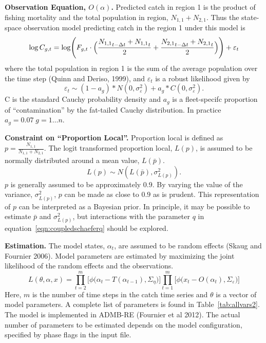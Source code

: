 \documentclass[12pt,letterpaper,twoside]{article}
\newcommand\None{{N_{1,1}}}
\newcommand\Ntwo{{N_{2,1}}}
\newcommand\Nsum{{N_{1,1}+N_{2,1}}}
\begin{document}
{\bf Observation Equation, $O(\alpha)$.}
Predicted catch in region 1 is the product of fishing mortality
and the total population in region, $\None+\Ntwo$.
Thus the state-space observation model predicting catch in the region 1
under this model is
\begin{equation}
\log C_{g,t} = \log \Biggl(F_{g,t}\cdot\Bigl(\frac{\None_{t-\Delta t}+\None_t}{2}
                           +\frac{\Ntwo_{t-\Delta
t}+\Ntwo_t}{2}\Bigr)\Biggr) + \varepsilon_t
\label{eqn:obs2}
\end{equation}
where the total population in region 1 is the sum of the average
population over the time step (Quinn and Deriso, 1999), and
$\varepsilon_t$ is a robust likelihood given by
\begin{equation}
\varepsilon_t \sim (1-a_g)*N(0,\sigma^2_\varepsilon)+a_g*C(0,\sigma^2_\varepsilon).
\end{equation}
C is the standard Cauchy probability density and $a_g$ is a
fleet-specifc proportion of ``contamination'' by the fat-tailed Cauchy
distribution. In practice $a_g = 0.07\; g=1\ldots n$.

{\bf Constraint on ``Proportion Local''.}
Proportion local is defined as $p = \frac{\None}{\Nsum}$. The logit
transformed proportion local, $L(p)$, is assumed to be normally
distributed around a mean value, $L(\bar{p})$.
\begin{equation}
\label{eqn:LpropL}
L(p)\sim N(L(\bar{p}),\sigma^2_{L(p)}).
\end{equation} 
$p$ is generally assumed to be approximately $0.9$. By varying the
value of the variance, $\sigma^2_{L(p)}$, $p$ can be made as
close to $0.9$ as is prudent.
This representation of $p$ can be interpreted as a Bayesian prior.
In principle, it may be possible to
estimate $\bar{p}$ and $\sigma^2_{L(p)}$, but interactions with
the parameter $q$ in equation~\ref{eqn:coupledschaeferq} should be
explored.

{\bf Estimation.} The model states, $\alpha_t$, are assumed to be random
effects (Skaug and Fournier 2006). Model parameters are estimated by
maximizing the joint likelihood of the random
effects and the observations.
\begin{equation}
L(\theta,\alpha,x)=
\prod^m_{t=2}\big[\phi\big(\alpha_t-T(\alpha_{t-1}), \Sigma_\eta\big)\big]
\prod^m_{t=1}\big[\phi\big(x_t-O(\alpha_t), \Sigma_\varepsilon\big)\big]
\end{equation}
Here, $m$ is the number of time steps in the catch time series and
$\theta$ is a vector of model parameters. A complete list of
parameters is found in Table~\ref{tab:allvars2}. 
The model is implemented in ADMB-RE (Fournier et al 2012).
The actual number of
parameters to be estimated depends on the model configuration,
specified by phase flags in the input file. 
\end{document}
